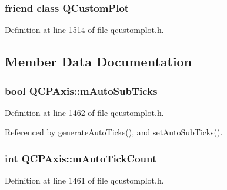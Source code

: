 \hypertarget{class_q_c_p_axis_a1cdf9df76adcfae45261690aa0ca2198}{}
\subsubsection[{Q\+Custom\+Plot}]{\setlength{\rightskip}{0pt plus 5cm}friend class {\bf Q\+Custom\+Plot}\hspace{0.3cm}{\ttfamily [friend]}}\label{class_q_c_p_axis_a1cdf9df76adcfae45261690aa0ca2198}


Definition at line 1514 of file qcustomplot.\+h.



\subsection{Member Data Documentation}
\hypertarget{class_q_c_p_axis_aaae980b0d193d959674e314dbb6c2c3b}{}
\subsubsection[{m\+Auto\+Sub\+Ticks}]{\setlength{\rightskip}{0pt plus 5cm}bool Q\+C\+P\+Axis\+::m\+Auto\+Sub\+Ticks\hspace{0.3cm}{\ttfamily [protected]}}\label{class_q_c_p_axis_aaae980b0d193d959674e314dbb6c2c3b}


Definition at line 1462 of file qcustomplot.\+h.



Referenced by generate\+Auto\+Ticks(), and set\+Auto\+Sub\+Ticks().

\hypertarget{class_q_c_p_axis_a499fbb67111e4b204738f6c1aa28d842}{}
\subsubsection[{m\+Auto\+Tick\+Count}]{\setlength{\rightskip}{0pt plus 5cm}int Q\+C\+P\+Axis\+::m\+Auto\+Tick\+Count\hspace{0.3cm}{\ttfamily [protected]}}\label{class_q_c_p_axis_a499fbb67111e4b204738f6c1aa28d842}


Definition at line 1461 of file qcustomplot.\+h.



